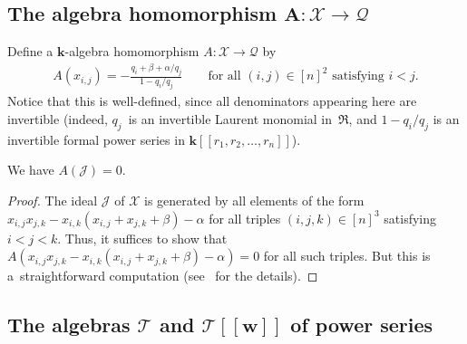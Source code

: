 \subsection[The algebra homomorphism $A\colon \mathcal{X}\rightarrow\mathcal{Q}$]{The algebra homomorphism $\boldsymbol{A\colon \mathcal{X}\rightarrow\mathcal{Q}}$}

\begin{Definition}\label{def.A}Define a $\mathbf{k}$-algebra homomorphism $A\colon \mathcal{X}\rightarrow\mathcal{Q}$ by
\begin{gather*}
A ( x_{i,j} ) =-\frac{q_{i}+\beta+\alpha/q_{j}}{1-q_{i}/q_{j}}\qquad \text{for all }(i,j) \in[n] ^{2}\text{ satisfying }i<j.
\end{gather*}
Notice that this is well-defined, since all denominators appearing here are invertible (indeed, $q_{j}$~is an invertible Laurent monomial in~$\mathfrak{R}$, and $1-q_{i}/q_{j}$ is an invertible formal power series in
$\mathbf{k} [[ r_{1},r_{2},\ldots,r_{n} ] ] $).
\end{Definition}

\begin{Proposition}\label{prop.A.killsJ}We have $A ( \mathcal{J} ) =0$.
\end{Proposition}

\begin{proof}The ideal $\mathcal{J}$ of $\mathcal{X}$ is generated by all elements of the form $x_{i,j}x_{j,k}-x_{i,k} ( x_{i,j}+x_{j,k}+\beta ) -\alpha$ for all triples
$(i,j,k) \in[n] ^{3}$ satisfying $i<j<k$. Thus, it suffices to show that $A ( x_{i,j}x_{j,k}-x_{i,k} ( x_{i,j}+x_{j,k}+\beta ) -\alpha ) =0$ for all such triples. But this is a~straightforward computation (see~\cite{verlong} for the details).
\end{proof}

\subsection[The algebras $\mathcal{T}$ and $\protect{\mathcal{T}[[w]]}$ of power series]{The algebras $\boldsymbol{\mathcal{T}}$ and $\boldsymbol{\mathcal{T}[[w]]}$ of power series}

